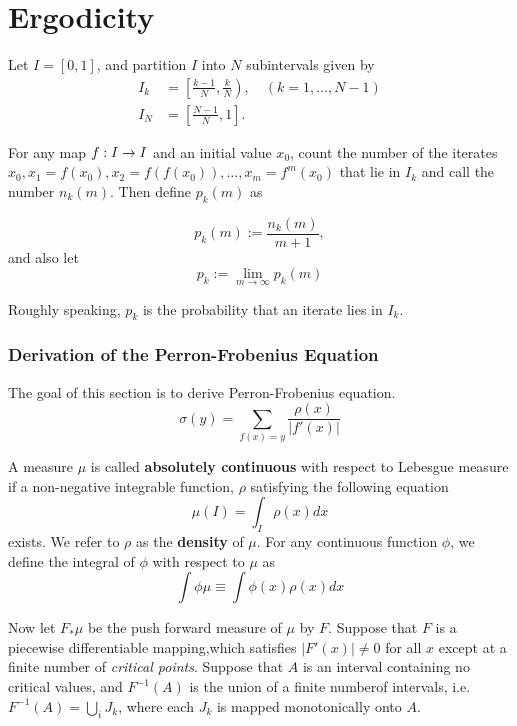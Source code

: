 \documentclass[11pt]{book}
\begin{document}
\chapter{Ergodicity}

Let $I = [0,1]$, and partition $I$ into $N$ subintervals given by
\begin{align*}
  I_k &= \left[\frac{k-1}{N}, \frac{k}{N} \right),\quad (k = 1, \ldots, N-1) \\
    I_N &= \left[\frac{N-1}{N}, 1 \right].
\end{align*}

For any map $f: I \rightarrow I$ and an initial value $x_0$, count the number
of the iterates $x_0, x_1 = f(x_0), x_2 = f(f(x_0)), \ldots, x_m = f^m(x_0)$
that lie in $I_k$ and call the number $n_k(m)$. Then define $p_k(m)$ as

\begin{equation*}
  p_k(m) := \frac{n_k(m)}{m+1},
\end{equation*}
and also let
\begin{equation*}
  p_k := \lim_{m \to \infty} p_k(m)
\end{equation*}

Roughly speaking, $p_k$ is the probability that an iterate lies in $I_k$.

\subsection{Derivation of the Perron-Frobenius Equation}
The goal of this section is to derive Perron-Frobenius equation.
\begin{equation}
  \sigma(y) = \sum\limits_{f(x) = y} \frac{\rho(x)}{|f'(x)|}
  \label{pfeqn}
\end{equation}

A measure $\mu$ is called \textbf{absolutely continuous} with respect to Lebesgue measure if a non-negative integrable function, $\rho$ satisfying the following equation
\begin{equation*}
  \mu(I) = \int_I \rho(x) dx
\end{equation*}
exists.
We refer to $\rho$ as the \textbf{density} of $\mu$. 
For any continuous function $\phi$, we define the integral of $\phi$ with respect to $\mu$ as
\begin{equation*}
  \int \phi\mu \equiv \int \phi(x)\rho(x)dx  
\end{equation*}

Now let $F_*\mu$ be the push forward measure of $\mu$ by $F$.
Suppose that $F$ is a piecewise differentiable mapping,which satisfies $|F'(x)| \neq 0$ for all $x$ except at a finite number of \textit{critical points}. 
Suppose that $A$ is an interval containing no critical values, and $F^{-1}(A)$ is the union of a finite numberof intervals, i.e. $F^{-1}(A) = \bigcup\limits_{i}J_k$, where each $J_k$ is mapped monotonically onto $A$.
\end{document}
